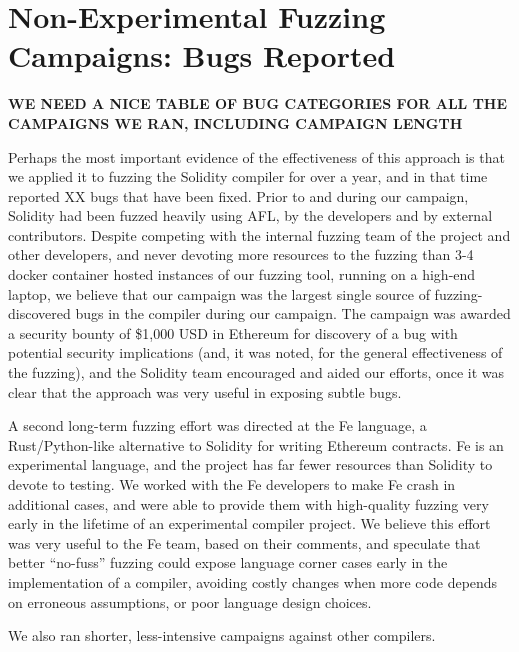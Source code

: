 \section{Non-Experimental Fuzzing Campaigns:  Bugs Reported}

{\bf WE NEED A NICE TABLE OF BUG CATEGORIES FOR ALL THE CAMPAIGNS WE RAN, INCLUDING CAMPAIGN LENGTH}

Perhaps the most important evidence of the effectiveness of this approach is that we applied it to fuzzing the Solidity compiler for over a year, and in that time reported XX bugs that have been fixed.  Prior to and during our campaign, Solidity had been fuzzed heavily using AFL, by the developers and by external contributors.  Despite competing with the internal fuzzing team of the project and other developers, and never devoting more resources to the fuzzing than 3-4 docker container hosted instances of our fuzzing tool, running on a high-end laptop, we believe that our campaign was the largest single source of fuzzing-discovered bugs in the compiler during our campaign.  The campaign was awarded a security bounty of \$1,000 USD in Ethereum for discovery of a bug with potential security implications (and, it was noted, for the general effectiveness of the fuzzing), and the Solidity team encouraged and aided our efforts, once it was clear that the approach was very useful in exposing subtle bugs.

A second long-term fuzzing effort was directed at the Fe language, a Rust/Python-like alternative to Solidity for writing Ethereum contracts.  Fe is an experimental language, and the project has far fewer resources than Solidity to devote to testing.  We worked with the Fe developers to make Fe crash in additional cases, and were able to provide them with high-quality fuzzing very early in the lifetime of an experimental compiler project.  We believe this effort was very useful to the Fe team, based on their comments, and speculate that better ``no-fuss'' fuzzing could expose language corner cases early in the implementation of a compiler, avoiding costly changes when more code depends on erroneous assumptions, or poor language design choices.

We also ran shorter, less-intensive campaigns against other compilers.